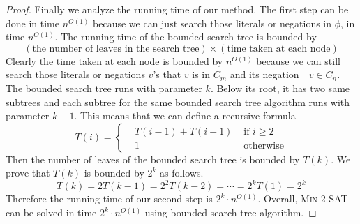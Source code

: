 \documentclass{article}
\newcommand{\pname}[1]{\textnormal{\textsc{#1}}}
\begin{document}
\begin{proof}
Finally we analyze the running time of our method. The first step can be done in time \(n^{O(1)}\) because we can just search those literals or negations in \(\phi\), in time \(n^{O(1)}\). The running time of the bounded search tree is bounded by $$(\text{the number of leaves in the search tree}) \times (\text{time taken at each node})$$ Clearly the time taken at each node is bounded by \(n^{O(1)}\) because we can still search those literals or negations \(v\)'s that \(v\) is in \(C_m\) and its negation \(\neg v \in C_n\). The bounded search tree runs with parameter \(k\). Below its root, it has two same subtrees and each subtree for the same bounded search tree algorithm runs with parameter \(k-1\). This means that we can define a recursive formula
\begin{equation}
T(i)=
\left\{
\begin{aligned}
&T(i-1)+T(i-1) &\text{  if   } i \geq 2\\
&1 &\text{ otherwise}
\end{aligned}
\right.
\end{equation}
Then the number of leaves of the bounded search tree is bounded by \(T(k)\). We prove that \(T(k)\) is bounded by \(2^k\) as follows. $$T(k)=2T(k-1)=2^2T(k-2)=\cdots=2^kT(1)=2^k$$ Therefore the running time of our second step is \(2^k\cdot n^{O(1)}\). Overall, \pname{Min-2-SAT} can be solved in time \(2^k \cdot n^{O(1)}\) using bounded search tree algorithm. 




\end{proof}




%
\end{document}
